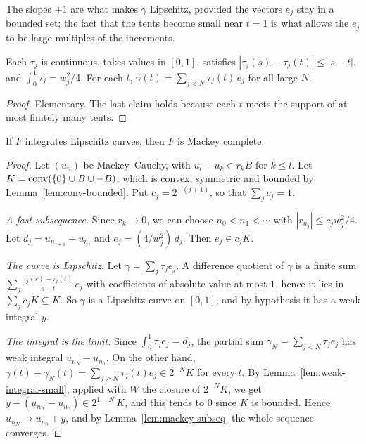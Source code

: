The slopes $\pm 1$ are what makes $\gamma$ Lipschitz, provided the vectors $e_j$ stay in a
bounded set; the fact that the tents become small near $t = 1$ is what allows the $e_j$ to be
large multiples of the increments.

\begin{lemma}
  \label{lem:tents}
  \leanok
  Each $\tau_j$ is continuous, takes values in $[0, 1]$, satisfies
  $|\tau_j(s) - \tau_j(t)| \leq |s - t|$, and $\int_0^1 \tau_j = w_j^2 / 4$. For each $t$,
  $\gamma(t) = \sum_{j < N} \tau_j(t)\, e_j$ for all large $N$.
\end{lemma}

\begin{proof}
  \leanok
  Elementary. The last claim holds because each $t$ meets the support of at most finitely many
  tents.
\end{proof}

\begin{theorem}
  \label{thm:lipschitz-to-mackey}
  \leanok
  If $F$ integrates Lipschitz curves, then $F$ is Mackey complete.
\end{theorem}

\begin{proof}
  \leanok
  Let $(u_n)$ be Mackey--Cauchy, with $u_l - u_k \in r_k B$ for $k \leq l$. Let
  $K = \operatorname{conv}(\{0\} \cup B \cup -B)$, which is convex, symmetric and bounded by
  Lemma~\ref{lem:conv-bounded}. Put $c_j = 2^{-(j+1)}$, so that $\sum_j c_j = 1$.

  \emph{A fast subsequence.} Since $r_k \to 0$, we can choose $n_0 < n_1 < \cdots$ with
  $|r_{n_j}| \leq c_j w_j^2 / 4$. Let $d_j = u_{n_{j+1}} - u_{n_j}$ and
  $e_j = (4 / w_j^2)\, d_j$. Then $e_j \in c_j K$.

  \emph{The curve is Lipschitz.} Let $\gamma = \sum_j \tau_j e_j$. A difference quotient of
  $\gamma$ is a finite sum $\sum_j \frac{\tau_j(s) - \tau_j(t)}{s - t}\, e_j$ with coefficients
  of absolute value at most $1$, hence it lies in $\sum_j c_j K \subseteq K$. So $\gamma$ is a
  Lipschitz curve on $[0, 1]$, and by hypothesis it has a weak integral $y$.

  \emph{The integral is the limit.} Since $\int_0^1 \tau_j e_j = d_j$, the partial sum
  $\gamma_N = \sum_{j < N} \tau_j e_j$ has weak integral $u_{n_N} - u_{n_0}$. On the other hand,
  $\gamma(t) - \gamma_N(t) = \sum_{j \geq N} \tau_j(t) e_j \in 2^{-N} K$ for every $t$. By
  Lemma~\ref{lem:weak-integral-small}, applied with $W$ the closure of $2^{-N} K$, we get
  $y - (u_{n_N} - u_{n_0}) \in 2^{1-N}\, \overline{K}$, and this tends to $0$ since $K$ is
  bounded. Hence $u_{n_N} \to u_{n_0} + y$, and by Lemma~\ref{lem:mackey-subseq} the whole
  sequence converges.
\end{proof}

